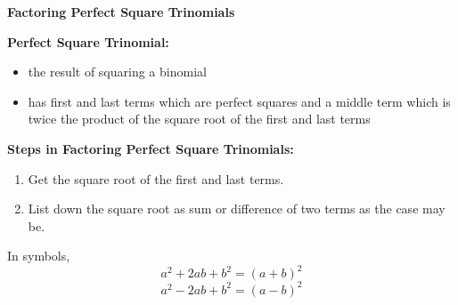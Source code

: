 \begin{center}
\textbf{Factoring Perfect Square Trinomials}
\end{center}

\vspace*{1ex}

\textbf{Perfect Square Trinomial:} 
\begin{itemize}
\item the  result  of  squaring  a  binomial
\item has  first  and  last  terms  which  are  perfect  squares  and  a  middle term which is twice the product of the square root of the first and last terms
\end{itemize}

\vspce 

\textbf{Steps in Factoring Perfect Square Trinomials:}

\begin{enumerate}
\item Get the square root of the first and last terms. 
\item List down the square root as sum or difference of two terms as the case may be.
\end{enumerate}

\vspce

In symbols, 
$$\displaystyle a^{2} + 2ab + b^{2} = (a + b)^{2}$$
$$\displaystyle a^{2} - 2ab + b^{2} = (a - b)^{2}$$
